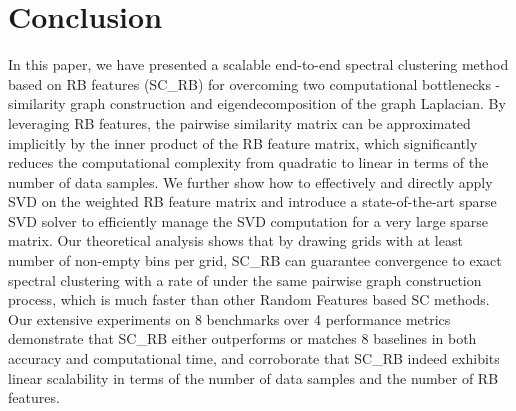 \documentclass[sigconf]{acmart}
\newcommand{\1}{\boldsymbol{1}}
\newcommand{\0}{\boldsymbol{0}}
\begin{document}
\section{Conclusion}
In this paper, we have presented a scalable end-to-end spectral clustering method based on RB features (SC\_RB) for overcoming two computational bottlenecks - similarity graph construction and eigendecomposition of the graph Laplacian. By leveraging RB features, the pairwise similarity matrix can be approximated implicitly by the inner product of the RB feature matrix, which significantly reduces the computational complexity from quadratic to linear in terms of the number of data samples. We further show how to effectively and directly apply SVD  on the weighted RB feature matrix and introduce a state-of-the-art sparse SVD solver to efficiently manage the SVD computation for a very large sparse matrix. Our theoretical analysis shows that by drawing  grids with at least  number of non-empty bins per grid, SC\_RB can guarantee convergence to exact spectral clustering with a rate of  under the same pairwise graph construction process, which is much faster than other Random Features based SC methods.
Our extensive experiments on 8 benchmarks over 4 performance metrics demonstrate that SC\_RB either outperforms or matches 8 baselines in both accuracy and computational time, and corroborate that SC\_RB indeed exhibits linear scalability in terms of the number of data samples and the number of RB features.




 


\end{document}
